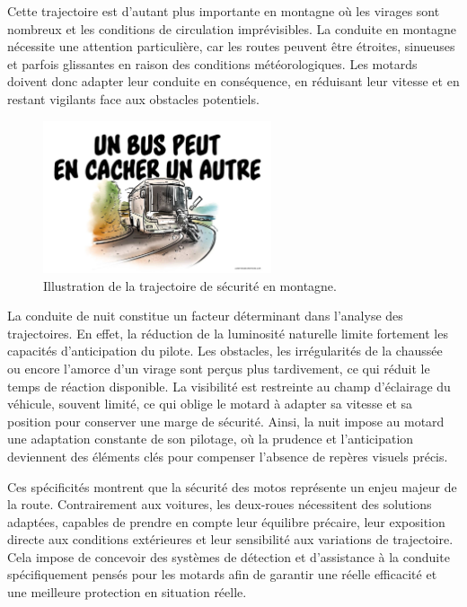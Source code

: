 Cette trajectoire est d'autant plus importante en montagne où les virages sont nombreux et les conditions de circulation imprévisibles. La conduite en montagne nécessite une attention particulière, car les routes peuvent être étroites, sinueuses et parfois glissantes en raison des conditions météorologiques. Les motards doivent donc adapter leur conduite en conséquence, en réduisant leur vitesse et en restant vigilants face aux obstacles potentiels.
\begin{figure}[H]
    \centering
    \includegraphics[width=0.6\textwidth]{etat_art/images/trajectoire-route-voie-bus-conduite_hd.jpg} 
    \caption{Illustration de la trajectoire de sécurité en montagne.}
\end{figure}
La conduite de nuit constitue un facteur déterminant dans l’analyse des trajectoires. En effet, la réduction de la luminosité naturelle limite fortement les capacités d’anticipation du pilote. Les obstacles, les irrégularités de la chaussée ou encore l’amorce d’un virage sont perçus plus tardivement, ce qui réduit le temps de réaction disponible. La visibilité est restreinte au champ d’éclairage du véhicule, souvent limité, ce qui oblige le motard à adapter sa vitesse et sa position pour conserver une marge de sécurité. 
Ainsi, la nuit impose au motard une adaptation constante de son pilotage, où la prudence et l’anticipation deviennent des éléments clés pour compenser l’absence de repères visuels précis.\\
\vspace{0.5cm}

Ces spécificités montrent que la sécurité des motos représente un enjeu majeur de la route. Contrairement aux voitures, les deux-roues nécessitent des solutions adaptées, capables de prendre en compte leur équilibre précaire, leur exposition directe aux conditions extérieures et leur sensibilité aux variations de trajectoire. Cela impose de concevoir des systèmes de détection et d’assistance à la conduite spécifiquement pensés pour les motards afin de garantir une réelle efficacité et une meilleure protection en situation réelle.

